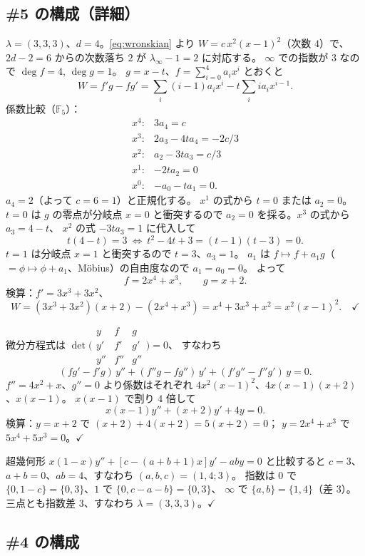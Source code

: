 \documentclass[a4paper,11pt]{ltjsarticle}
\theoremstyle{plain}
\theoremstyle{definition}
\newcommand{\bbF}{\mathbb{F}}
\begin{document}
\subsection{\#5 の構成（詳細）}\label{ss:no5}

$\lambda=(3,3,3)$、$d=4$。\eqref{eq:wronskian} より $W=c\,x^2(x-1)^2$（次数 $4$）で、
$2d-2=6$ からの次数落ち $2$ が $\lambda_\infty-1=2$ に対応する。
$\infty$ での指数が $3$ なので $\deg f=4$, $\deg g=1$。
$g=x-t$、$f=\sum_{i=0}^4a_ix^i$ とおくと
\[
  W=f'g-fg'=\sum_i(i-1)a_ix^i-t\sum_i ia_ix^{i-1} .
\]
係数比較（$\bbF_5$）：
\[
  \begin{array}{ll}
  x^4:&3a_4=c\\
  x^3:&2a_3-4ta_4=-2c/3\\
  x^2:&a_2-3ta_3=c/3\\
  x^1:&-2ta_2=0\\
  x^0:&-a_0-ta_1=0 .
  \end{array}
\]
$a_4=2$（よって $c=6=1$）と正規化する。
$x^1$ の式から $t=0$ または $a_2=0$。$t=0$ は $g$ の零点が分岐点 $x=0$ と衝突するので
$a_2=0$ を採る。$x^3$ の式から $a_3=4-t$、
$x^2$ の式 $-3ta_3=1$ に代入して
\[
  t(4-t)=3\ \Longleftrightarrow\ t^2-4t+3=(t-1)(t-3)=0 .
\]
$t=1$ は分岐点 $x=1$ と衝突するので $t=3$、$a_3=1$。
$a_1$ は $f\mapsto f+a_1g$（$=\phi\mapsto\phi+a_1$、Möbius）の自由度なので $a_1=a_0=0$。
よって
\[
  f=2x^4+x^3,\qquad g=x+2 .
\]
検算：$f'=3x^3+3x^2$、
\[
  W=(3x^3+3x^2)(x+2)-(2x^4+x^3)=x^4+3x^3+x^2=x^2(x-1)^2 .\quad\checkmark
\]

微分方程式は
$\det\bigl(\begin{smallmatrix}y&f&g\\ y'&f'&g'\\ y''&f''&g''\end{smallmatrix}\bigr)=0$、
すなわち
\[
  (fg'-f'g)\,y''+(f''g-fg'')\,y'+(f'g''-f''g')\,y=0 .
\]
$f''=4x^2+x$、$g''=0$ より係数はそれぞれ
$4x^2(x-1)^2$、$4x(x-1)(x+2)$、$x(x-1)$。
$x(x-1)$ で割り $4$ 倍して
\[
  x(x-1)y''+(x+2)y'+4y=0 .
\]
検算：$y=x+2$ で $(x+2)+4(x+2)=5(x+2)=0$；
$y=2x^4+x^3$ で $5x^4+5x^3=0$。\quad$\checkmark$

超幾何形 $x(1-x)y''+[c-(a+b+1)x]y'-aby=0$ と比較すると
$c=3$、$a+b=0$、$ab=4$、すなわち $(a,b,c)=(1,4;3)$。
指数は $0$ で $\{0,1-c\}=\{0,3\}$、$1$ で $\{0,c-a-b\}=\{0,3\}$、
$\infty$ で $\{a,b\}=\{1,4\}$（差 $3$）。
三点とも指数差 $3$、すなわち $\lambda=(3,3,3)$。\quad$\checkmark$

\subsection{\#4 の構成}
\end{document}
